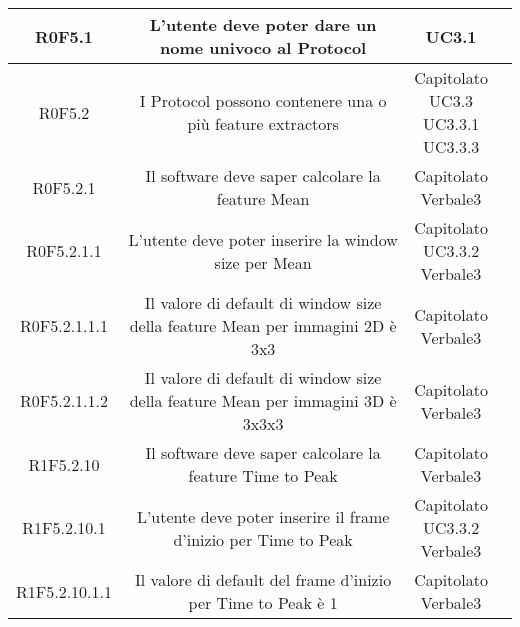 \begin{center}
\begin{longtable}{|c|c|c|c|}
\hline
R0F5.1   & \parbox[t]{\larghezza}{L'utente deve poter dare un nome univoco al Protocol\glossario{}}  & \parbox[t]{\dimFonti}{ UC3.1 \\} \\
\hline
R0F5.2   & \parbox[t]{\larghezza}{I Protocol\glossario{} possono contenere una o più feature extractors\glossario{}}  & \parbox[t]{\dimFonti}{ Capitolato \\ UC3.3 \\ UC3.3.1 \\ UC3.3.3 \\} \\
\hline
R0F5.2.1   & \parbox[t]{\larghezza}{Il software deve saper calcolare la feature\glossario{} Mean}  & \parbox[t]{\dimFonti}{ Capitolato \\ Verbale3 \\} \\
\hline
R0F5.2.1.1   & \parbox[t]{\larghezza}{L'utente deve poter inserire la window size per Mean}  & \parbox[t]{\dimFonti}{ Capitolato \\ UC3.3.2 \\ Verbale3 \\} \\
\hline
R0F5.2.1.1.1   & \parbox[t]{\larghezza}{Il valore di default di window size della feature\glossario{} Mean per immagini 2D è 3x3 }  & \parbox[t]{\dimFonti}{ Capitolato \\ Verbale3 \\} \\
\hline
R0F5.2.1.1.2   & \parbox[t]{\larghezza}{Il valore di default di window size della feature\glossario{} Mean per immagini 3D è 3x3x3}  & \parbox[t]{\dimFonti}{ Capitolato \\ Verbale3 \\} \\
\hline
R1F5.2.10   & \parbox[t]{\larghezza}{Il software deve saper calcolare la feature\glossario{} Time to Peak}  & \parbox[t]{\dimFonti}{ Capitolato \\ Verbale3 \\} \\
\hline
R1F5.2.10.1   & \parbox[t]{\larghezza}{L'utente deve poter inserire il frame d'inizio per Time to Peak}  & \parbox[t]{\dimFonti}{ Capitolato \\ UC3.3.2 \\ Verbale3 \\} \\
\hline
R1F5.2.10.1.1   & \parbox[t]{\larghezza}{Il valore di default del frame d'inizio per Time to Peak è 1}  & \parbox[t]{\dimFonti}{ Capitolato \\ Verbale3 \\} \\

\end{longtable}
\end{center}
